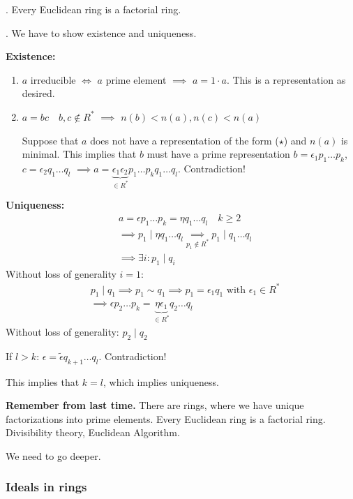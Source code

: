 \Theorem.
Every Euclidean ring is a factorial ring.

\Proof.
We have to show existence and uniqueness.

\textbf{Existence:}
\begin{enumerate}[{Case} 1:]
  \item $a$ irreducible $\Leftrightarrow$ $a$ prime element $\implies$ $a=1\cdot a$. This is a representation as desired.

  \item $a= bc \quad b,c \not\in R^{*}$ $\implies$ $n(b) < n(a), n(c) < n(a)$

  Suppose that $a$ does not have a representation of the form ($\star$) and $n(a)$ is minimal.
  This implies that $b$ must have a prime representation $b = \epsilon_1 p_1 \ldots p_k$, $c = \epsilon_2 q_1 \ldots q_l$
  $\implies a = \underbrace{\epsilon_1 \epsilon_2}_{\in R^{*}} p_1 \ldots p_k q_1 \ldots q_l$. Contradiction!
\end{enumerate}

\textbf{Uniqueness:}
\begin{align*}
  & a = \epsilon p_1 \ldots p_k = \eta q_1 \ldots q_l \quad k\geq 2\\
  & \implies p_1 ∣ \eta q_1 \ldots q_l \underset{p_1 \not\in R^{*}}{\implies}{} p_1 ∣ q_1 \ldots q_l\\
  & \implies \exists i: p_1 ∣ q_i
\end{align*}
Without loss of generality $i = 1$:
\begin{align*}
  & p_1∣q_1 \implies p_1 \sim q_1 \implies p_1 = \epsilon_1 q_1 \text{ with } \epsilon_1 \in R^{*}\\
  & \implies\epsilon p_2 \ldots p_k = \underbrace{\eta \epsilon_1}_{\in R^{*}} q_2 \ldots q_l
\end{align*}
Without loss of generality: $p_2∣q_2$

If $l > k$: $\epsilon = \tilde{\epsilon} q_{k+1} \ldots q_l$. Contradiction!

This implies that $k=l$, which implies uniqueness.


\textbf{Remember from last time.}
There are rings, where we have unique factorizations into prime elements.
Every Euclidean ring is a factorial ring. Divisibility theory, Euclidean Algorithm.

We need to go deeper.

\subsubsection{Ideals in rings}

